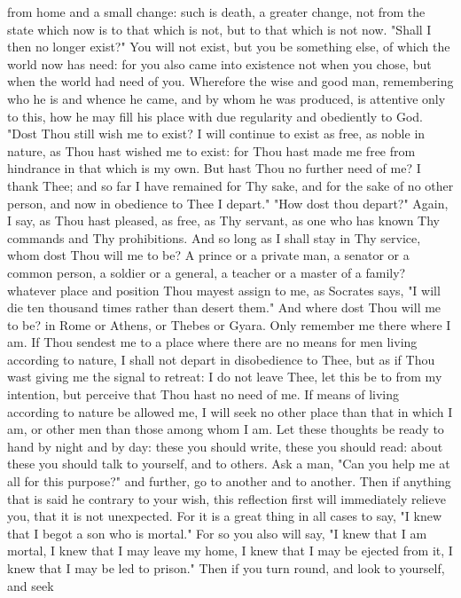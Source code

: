 \documentclass[a4paper]{article}
\begin{document}
from home and a small change: such is death, a greater change, not from the
state which now is to that which is not, but to that which is not now. "Shall I
then no longer exist?" You will not exist, but you be something else, of which
the world now has need: for you also came into existence not when you chose,
but when the world had need of you.
    Wherefore the wise and good man, remembering who he is and whence he came,
and by whom he was produced, is attentive only to this, how he may fill his
place with due regularity and obediently to God. "Dost Thou still wish me to
exist? I will continue to exist as free, as noble in nature, as Thou hast
wished me to exist: for Thou hast made me free from hindrance in that which is
my own. But hast Thou no further need of me? I thank Thee; and so far I have
remained for Thy sake, and for the sake of no other person, and now in
obedience to Thee I depart." "How dost thou depart?" Again, I say, as Thou hast
pleased, as free, as Thy servant, as one who has known Thy commands and Thy
prohibitions. And so long as I shall stay in Thy service, whom dost Thou will
me to be? A prince or a private man, a senator or a common person, a soldier or
a general, a teacher or a master of a family? whatever place and position Thou
mayest assign to me, as Socrates says, "I will die ten thousand times rather
than desert them." And where dost Thou will me to be? in Rome or Athens, or
Thebes or Gyara. Only remember me there where I am. If Thou sendest me to a
place where there are no means for men living according to nature, I shall not
depart in disobedience to Thee, but as if Thou wast giving me the signal to
retreat: I do not leave Thee, let this be to from my intention, but perceive
that Thou hast no need of me. If means of living according to nature be allowed
me, I will seek no other place than that in which I am, or other men than those
among whom I am.
    Let these thoughts be ready to hand by night and by day: these you should
write, these you should read: about these you should talk to yourself, and to
others. Ask a man, "Can you help me at all for this purpose?" and further, go
to another and to another. Then if anything that is said he contrary to your
wish, this reflection first will immediately relieve you, that it is not
unexpected. For it is a great thing in all cases to say, "I knew that I begot a
son who is mortal." For so you also will say, "I knew that I am mortal, I knew
that I may leave my home, I knew that I may be ejected from it, I knew that I
may be led to prison." Then if you turn round, and look to yourself, and seek
\end{document}
